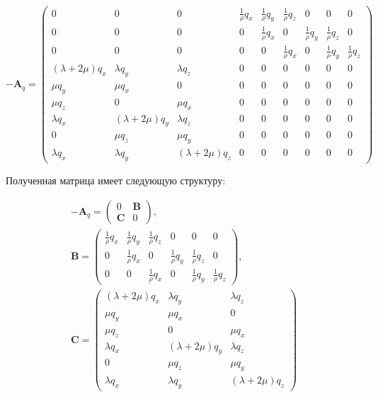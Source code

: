 \begin{equation}
\label{matrix_generalized_elastic}
- \mathbf{A}_q =
\left( \begin{array}{cccccccccccc}
0 & 0 & 0 & \frac 1 \rho q_x & \frac 1 \rho q_y & \frac 1 \rho q_z & 0 & 0 & 0 \\ 
0 & 0 & 0 & 0 & \frac 1 \rho q_x & 0 & \frac 1 \rho q_y & \frac 1 \rho q_z & 0 \\ 
0 & 0 & 0 & 0 & 0 & \frac 1 \rho q_x & 0 & \frac 1 \rho q_y & \frac 1 \rho q_z \\ 
(\lambda+2\mu) q_x & \lambda q_y & \lambda q_z & 0 & 0 & 0 & 0 & 0 & 0 \\ 
\mu q_y & \mu q_x & 0 & 0 & 0 & 0 & 0 & 0 & 0 \\ 
\mu q_z & 0 & \mu q_x & 0 & 0 & 0 & 0 & 0 & 0 \\ 
\lambda q_x & (\lambda+2\mu) q_y & \lambda q_z & 0 & 0 & 0 & 0 & 0 & 0 \\ 
0 & \mu q_z & \mu q_y & 0 & 0 & 0 & 0 & 0 & 0 \\ 
\lambda q_x & \lambda q_y & (\lambda+2\mu) q_z & 0 & 0 & 0 & 0 & 0 & 0  
\end{array} \right)
\end{equation}

Полученная матрица имеет следующую структуру:

\begin{eqnarray}
- \mathbf{A}_q =
\left( \begin{array}{cccccccccccc}
0 & \mathbf{B} \\
\mathbf{C} & 0
\end{array} \right),
\nonumber\\
\mathbf{B} = 
\left( \begin{array}{cccccccccccc}
\frac 1 \rho q_x & \frac 1 \rho q_y & \frac 1 \rho q_z & 0 & 0 & 0 \\ 
0 & \frac 1 \rho q_x & 0 & \frac 1 \rho q_y & \frac 1 \rho q_z & 0 \\ 
0 & 0 & \frac 1 \rho q_x & 0 & \frac 1 \rho q_y & \frac 1 \rho q_z 
\end{array} \right),
\nonumber\\
\mathbf{C} = 
\left( \begin{array}{cccccccccccc}
(\lambda+2\mu) q_x & \lambda q_y & \lambda q_z \\ 
\mu q_y & \mu q_x & 0 \\ 
\mu q_z & 0 & \mu q_x \\ 
\lambda q_x & (\lambda+2\mu) q_y & \lambda q_z \\ 
0 & \mu q_z & \mu q_y \\ 
\lambda q_x & \lambda q_y & (\lambda+2\mu) q_z  
\end{array} \right)
\end{eqnarray}

